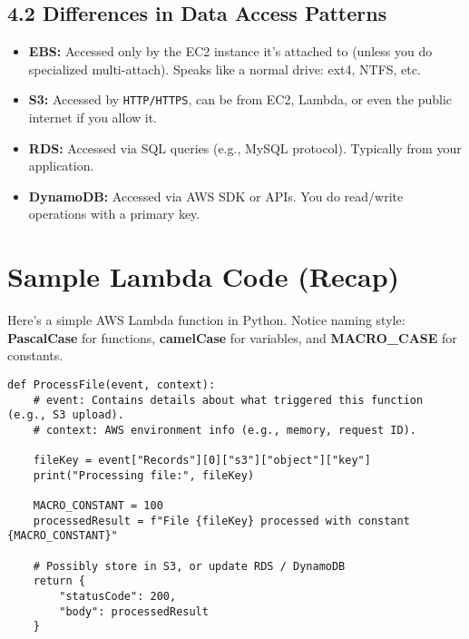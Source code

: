 \documentclass[12pt]{article}
\begin{document}
\subsection*{4.2 Differences in Data Access Patterns}
\begin{itemize}
    \item \textbf{EBS:} Accessed only by the EC2 instance it's attached to (unless you do specialized multi-attach). Speaks like a normal drive: ext4, NTFS, etc.
    \item \textbf{S3:} Accessed by \texttt{HTTP/HTTPS}, can be from EC2, Lambda, or even the public internet if you allow it.
    \item \textbf{RDS:} Accessed via SQL queries (e.g., MySQL protocol). Typically from your application.
    \item \textbf{DynamoDB:} Accessed via AWS SDK or APIs. You do read/write operations with a primary key.
\end{itemize}

\clearpage

\section{Sample Lambda Code (Recap)}
\justifying
Here’s a simple AWS Lambda function in Python. Notice naming style: \textbf{PascalCase} for functions, \textbf{camelCase} for variables, and \textbf{MACRO\_CASE} for constants.

\begin{verbatim}
def ProcessFile(event, context):
    # event: Contains details about what triggered this function (e.g., S3 upload).
    # context: AWS environment info (e.g., memory, request ID).

    fileKey = event["Records"][0]["s3"]["object"]["key"]
    print("Processing file:", fileKey)

    MACRO_CONSTANT = 100
    processedResult = f"File {fileKey} processed with constant {MACRO_CONSTANT}"

    # Possibly store in S3, or update RDS / DynamoDB
    return {
        "statusCode": 200,
        "body": processedResult
    }
\end{verbatim}

\clearpage

\end{document}
